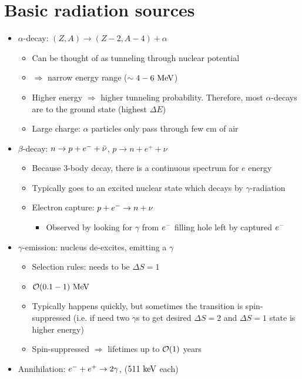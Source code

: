 \section{Basic radiation sources}
\begin{itemize}
  \item $\alpha$-decay: $(Z,A)\rightarrow(Z-2,A-4)+\alpha$
  \begin{itemize}
    \item Can be thought of as tunneling through nuclear potential
    \item $\Rightarrow$ narrow energy range ($\sim4-6~\text{MeV}$)
    \item Higher energy $\Rightarrow$ higher tunneling probability. Therefore, most $\alpha$-decays are to the ground state (highest $\Delta E$)
    \item Large charge: $\alpha$ particles only pass through few cm of air
  \end{itemize}
  \item $\beta$-decay: $n\rightarrow p+e^- + {\bar{\nu}}$, $p\rightarrow n+e^+ + \nu$
  \begin{itemize}
    \item Because $3$-body decay, there is a continuous spectrum for $e$ energy
    \item Typically goes to an excited nuclear state which decays by $\gamma$-radiation
    \item Electron capture: $p+e^{-}\rightarrow n+\nu$
    \begin{itemize}
      \item Observed by looking for $\gamma$ from $e^{-}$ filling hole left by captured $e^{-}$
    \end{itemize}
  \end{itemize}
  \item $\gamma$-emission: nucleus de-excites, emitting a $\gamma$
  \begin{itemize}
    \item Selection rules: needs to be $\Delta S = 1$
    \item $\mathcal{O}(0.1-1)~\text{MeV}$
    \item Typically happens quickly, but sometimes the transition is spin-suppressed (i.e. if need two $\gamma$s to get desired $\Delta S=2$ and $\Delta S=1$ state is higher energy)
    \item Spin-suppressed $\Rightarrow$ lifetimes up to $\mathcal{O}(1) $ years
  \end{itemize}
  \item Annihilation: $e^{-}+e^{+}\rightarrow2\gamma$, ($511~\text{keV}$ each)

\end{itemize}

